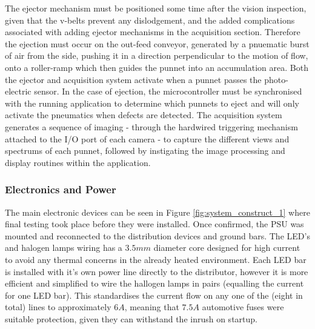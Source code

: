 \documentclass[fleqn,twoside]{article}
\begin{document}
The ejector mechanism must be positioned some time after the vision inspection, given that the v-belts prevent any dislodgement, and the added complications associated with adding ejector mechanisms in the acquisition section. Therefore the ejection must occur on the out-feed conveyor, generated by a pnuematic burst of air from the side, pushing it in a direction perpendicular to the motion of flow, onto a roller-ramp which then guides the punnet into an accumulation area. Both the ejector and acquisition system activate when a punnet passes the photo-electric sensor. In the case of ejection, the microcontroller must be synchronised with the running application to determine which punnets to eject and will only activate the pneumatics when defects are detected. The acquisition system generates a sequence of imaging - through the hardwired triggering mechanism attached to the I/O port of each camera - to capture the different views and spectrums of each punnet, followed by instigating the image processing and display routines within the application. 


\subsubsection{Electronics and Power}


The main electronic devices can be seen in Figure \ref{fig:system_construct_1} where final testing took place before they were installed. Once confirmed, the PSU was mounted and reconnected to the distribution devices and ground bars. The LED's and halogen lamps wiring has a $3.5mm$ diameter core designed for high current to avoid any thermal concerns in the already heated environment. Each LED bar is installed with it's own power line directly to the distributor, however it is more efficient and simplified to wire the hallogen lamps in pairs (equalling the current for one LED bar). This standardises the current flow on any one of the (eight in total) lines to approximately $6A$, meaning that $7.5A$ automotive fuses were suitable protection, given they can withstand the inrush on startup. 
\end{document}

